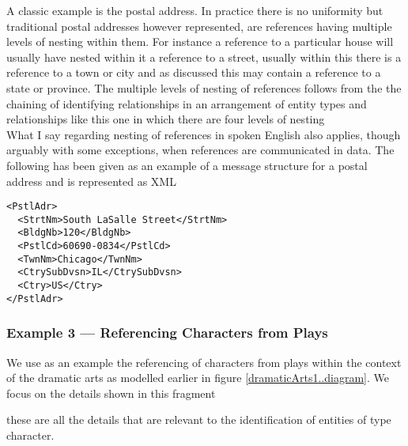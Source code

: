 A classic example is the postal address.  
In practice there is no uniformity  but traditional postal addresses however
represented, are references having multiple levels of nesting within them.
For instance a reference to a particular house will usually have nested within it a reference to a street, usually within this there is a reference to a town or city and
as discussed this may contain a reference to a state or province.  
The multiple levels of nesting of references follows from the
the chaining of identifying relationships in an arrangement
of entity types and relationships like this one in which there are four levels of nesting
\begin{equation*}

\end{equation*}
\mynote
What I say regarding nesting of references in spoken English also applies, though arguably with some exceptions, when references are communicated in data.
The following has been given as an example of a message structure for a postal address and is represented as XML
\begin{verbatim}
<PstlAdr>
  <StrtNm>South LaSalle Street</StrtNm>
  <BldgNb>120</BldgNb>
  <PstlCd>60690-0834</PstlCd>
  <TwnNm>Chicago</TwnNm>
  <CtrySubDvsn>IL</CtrySubDvsn>
  <Ctry>US</Ctry>
</PstlAdr>
\end{verbatim}

\subsubsection{Example 3 --- Referencing Characters from Plays}
\label{exampleReferencingCharacters}
\mynote
 We use as an example the referencing of characters from  plays
 within the context of  the  dramatic arts
   as modelled earlier in figure \ref{dramaticArts1..diagram}.
We focus on the details shown in this fragment 
\begin{equation*}

\end{equation*}

these are all the details that are relevant to the identification of entities of type character.


